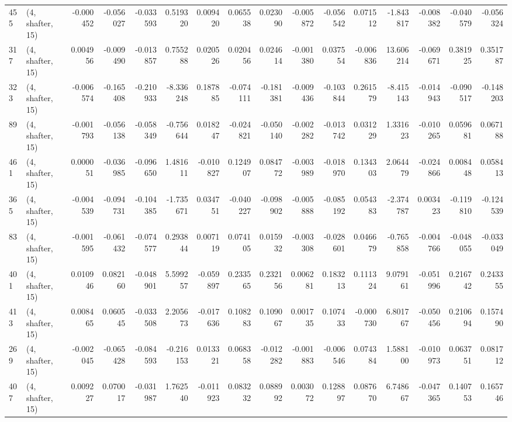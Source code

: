 \begin{tabular}{llrrrrrrrrrrrrrr}
455 &  (4, shafter, 15) &  -0.000452 & -0.056027 & -0.033593 &    0.519320 &  0.009420 &   0.065538 &  0.023090 & -0.005872 & -0.056542 &  0.071512 &    -1.843817 & -0.008382 & -0.040579 & -0.056324 \\
317 &  (4, shafter, 15) &   0.004956 & -0.009490 & -0.013857 &    0.755288 &  0.020526 &   0.020456 &  0.024614 & -0.001380 &  0.037554 & -0.006836 &    13.606214 & -0.069671 &  0.381925 &  0.351787 \\
323 &  (4, shafter, 15) &  -0.006574 & -0.165408 & -0.210933 &   -8.336248 &  0.187885 &  -0.074111 & -0.181381 & -0.009436 & -0.103844 &  0.261579 &    -8.415143 & -0.014943 & -0.090517 & -0.148203 \\
89  &  (4, shafter, 15) &  -0.001793 & -0.056138 & -0.058349 &   -0.756644 &  0.018247 &  -0.024821 & -0.050140 & -0.002282 & -0.013742 &  0.031229 &     1.331623 & -0.010265 &  0.059681 &  0.067188 \\
461 &  (4, shafter, 15) &   0.000051 & -0.036985 & -0.096650 &    1.481611 & -0.010827 &   0.124907 &  0.084772 & -0.003989 & -0.018970 &  0.134303 &     2.064479 & -0.024866 &  0.008448 &  0.058413 \\
365 &  (4, shafter, 15) &  -0.004539 & -0.094731 & -0.104385 &   -1.735671 &  0.034751 &  -0.040227 & -0.098902 & -0.005888 & -0.085192 &  0.054383 &    -2.374787 &  0.003423 & -0.119810 & -0.124539 \\
83  &  (4, shafter, 15) &  -0.001595 & -0.061432 & -0.074577 &    0.293844 &  0.007119 &   0.074105 &  0.015932 & -0.003308 & -0.028601 &  0.046679 &    -0.765858 & -0.004766 & -0.048055 & -0.033049 \\
401 &  (4, shafter, 15) &   0.010946 &  0.082160 & -0.048901 &    5.599257 & -0.059897 &   0.233565 &  0.232156 &  0.006281 &  0.183213 &  0.111324 &     9.079161 & -0.051996 &  0.216742 &  0.243355 \\
413 &  (4, shafter, 15) &   0.008465 &  0.060545 & -0.033508 &    2.205673 & -0.017636 &   0.108283 &  0.109067 &  0.001735 &  0.107433 & -0.000730 &     6.801767 & -0.050456 &  0.210694 &  0.157490 \\
269 &  (4, shafter, 15) &  -0.002045 & -0.065428 & -0.084593 &   -0.216153 &  0.013321 &   0.068358 & -0.012282 & -0.001883 & -0.006546 &  0.074384 &     1.588100 & -0.010973 &  0.063751 &  0.081712 \\
407 &  (4, shafter, 15) &   0.009227 &  0.070017 & -0.031987 &    1.762540 & -0.011923 &   0.083232 &  0.088992 &  0.003072 &  0.128897 &  0.087670 &     6.748667 & -0.047365 &  0.140753 &  0.165746 \\

\end{tabular}
